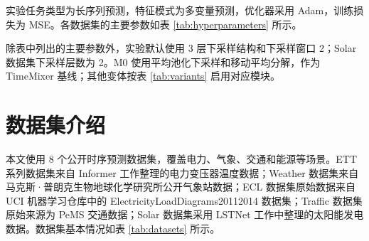 实验任务类型为长序列预测，特征模式为多变量预测，优化器采用 Adam，训练损失为 MSE。各数据集的主要参数如表 \ref{tab:hyperparameters} 所示。

\begin{table}[htbp]
    \centering
    \caption{主要实验参数设置}
    \label{tab:hyperparameters}
\end{table}

除表中列出的主要参数外，实验默认使用 3 层下采样结构和下采样窗口 2；Solar 数据集下采样层数为 2。M0 使用平均池化下采样和移动平均分解，作为 TimeMixer 基线；其他变体按表 \ref{tab:variants} 启用对应模块。

\section{数据集介绍}

本文使用 8 个公开时序预测数据集，覆盖电力、气象、交通和能源等场景。ETT 系列数据集\cite{zhou2021informer}来自 Informer 工作整理的电力变压器温度数据；Weather 数据集\cite{maxplanck2020weather}来自马克斯·普朗克生物地球化学研究所公开气象站数据；ECL 数据集\cite{trindade2015electricity}原始数据来自 UCI 机器学习仓库中的 ElectricityLoadDiagrams20112014 数据集；Traffic 数据集\cite{chen2001pems}原始来源为 PeMS 交通数据；Solar 数据集\cite{lai2018lstnet}采用 LSTNet 工作中整理的太阳能发电数据。数据集基本情况如表 \ref{tab:datasets} 所示。

